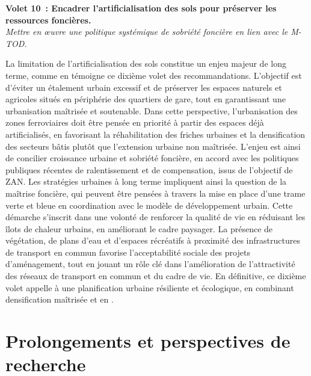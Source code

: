 \begin{refsegment}
    \begin{displayquote}
\textbf{Volet 10~: Encadrer l'artificialisation des sols pour préserver les ressources foncières.}
\\
\textsl{Mettre en œuvre une politique systémique de sobriété foncière en lien avec le \acrshort{M-TOD}.}
    \end{displayquote}
La limitation de l’artificialisation des sols constitue un enjeu majeur de long terme, comme en témoigne ce dixième volet des recommandations. L’objectif est d’éviter un étalement urbain excessif et de préserver les espaces naturels et agricoles situés en périphérie des quartiers de gare, tout en garantissant une urbanisation maîtrisée et soutenable. Dans cette perspective, l’urbanisation des zones ferroviaires doit être pensée en priorité à partir des espaces déjà artificialisés, en favorisant la réhabilitation des friches urbaines et la densification des secteurs bâtis plutôt que l’extension urbaine non maîtrisée. L’enjeu est ainsi de concilier croissance urbaine et sobriété foncière, en accord avec les politiques publiques récentes de ralentissement et de compensation, issus de l'objectif de \acrfull{ZAN}. Les stratégies urbaines à long terme impliquent ainsi la question de la maîtrise foncière, qui peuvent être pensées à travers la mise en place d'une trame verte et bleue en coordination avec le modèle de développement urbain. Cette démarche s’inscrit dans une volonté de renforcer la qualité de vie en réduisant les îlots de chaleur urbains, en améliorant le cadre paysager. La présence de végétation, de plans d’eau et d’espaces récréatifs à proximité des infrastructures de transport en commun favorise l’acceptabilité sociale des projets d’aménagement, tout en jouant un rôle clé dans l'amélioration de l'attractivité des réseaux de transport en commun et du cadre de vie. En définitive, ce dixième volet appelle à une planification urbaine résiliente et écologique, en combinant densification maîtrisée et en .%

\section*{Prolongements et perspectives de recherche
    \label{conclusion-generale:perspectives}
    }


\end{refsegment}
